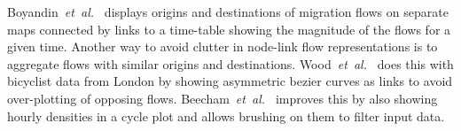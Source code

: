 \documentclass[a4paper,twocolumn]{article}
\newcommand{\etal}{\emph{et~al.~}}
\begin{document}
Boyandin~\etal\cite{Boyandin2011} displays origins and
destinations of migration flows on separate maps connected
by links to a time-table showing the magnitude of the flows
for a given time.
Another way to avoid clutter in node-link
flow representations is to aggregate flows with
similar origins and destinations.
Wood~\etal\cite{Wood2011} does this with bicyclist data from London
by showing asymmetric bezier curves as links to avoid
over-plotting of opposing flows.
Beecham~\etal\cite{Beecham2012} improves
this by also showing hourly densities in a cycle plot and
allows brushing on them to filter input data.



\end{document}
